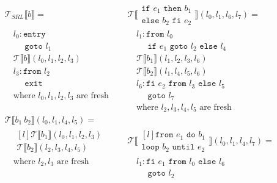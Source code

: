 \begin{figure}
  $$\begin{aligned}
    & \mathcal{T}_{SRL}\llbracket b\rrbracket =        &  \quad  & \mathcal{T}\llbracket\begin{matrix}\texttt{if }e_1\texttt{ then }b_1\\\texttt{else }b_2\texttt{ fi }e_2\end{matrix}\rrbracket(l_0,l_1,l_6,l_7) = \\
    & \quad l_0: \texttt{entry}                          &         & \quad l_1:  \texttt{from }l_0 \\
    & \quad \ \ \ \ \ \ \texttt{goto }l_1                      &         & \quad \ \ \ \ \ \ \texttt{if }e_1\texttt{ goto }l_2\texttt{ else }l_4\\
    & \quad \mathcal{T}\llbracket b\rrbracket(l_0,l_1,l_2,l_3) & & \quad \mathcal{T}\llbracket b_1\rrbracket(l_1,l_2,l_3,l_6)\\
    & \quad l_3: \texttt{from }l_2                       &         & \quad \mathcal{T}\llbracket b_2\rrbracket(l_1,l_4,l_5,l_6)\\
    & \quad \ \ \ \ \ \ \texttt{exit}                          &         & \quad l_6: \texttt{fi }e_2\texttt{ from }l_3\texttt{ else }l_5\\
    & \quad \text{where $l_0,l_1,l_2,l_3$ are fresh}   &         & \quad \ \ \ \ \ \ \texttt{goto }l_7\\
    &                                                  &         & \quad \text{where $l_2,l_3,l_4,l_5$ are fresh}\\
    & \mathcal{T}\llbracket b_1\ b_2\rrbracket(l_0,l_1,l_4,l_5) = \\
    & \quad \begin{matrix*}[l]\mathcal{T}\llbracket b_1\rrbracket(l_0,l_1,l_2,l_3)\\\mathcal{T}\llbracket b_2\rrbracket(l_2,l_3,l_4,l_5)\end{matrix*} & & \mathcal{T}\llbracket\begin{matrix*}[l]\texttt{from }e_1\texttt{ do }b_1\\\texttt{loop }b_2\texttt{ until }e_2\end{matrix*}\rrbracket(l_0,l_1,l_4,l_7) = \\
    & \quad \text{where $l_2,l_3$ are fresh}                     & & \quad l_1: \texttt{fi }e_1\texttt{ from }l_0\texttt{ else }l_6\\
    &                                                            & & \quad \ \ \ \ \ \ \texttt{goto }l_2\\

\end{aligned}$$
\end{figure}

